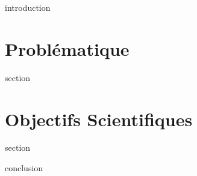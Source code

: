 \chaptertoc{}

\label{sec:2-int}
{introduction}

\section{Problématique}
\label{sec:2-1}
{section}

\section{Objectifs Scientifiques}
\label{sec:2-2}
{section}


\label{sec:2-cnc}
{conclusion}


